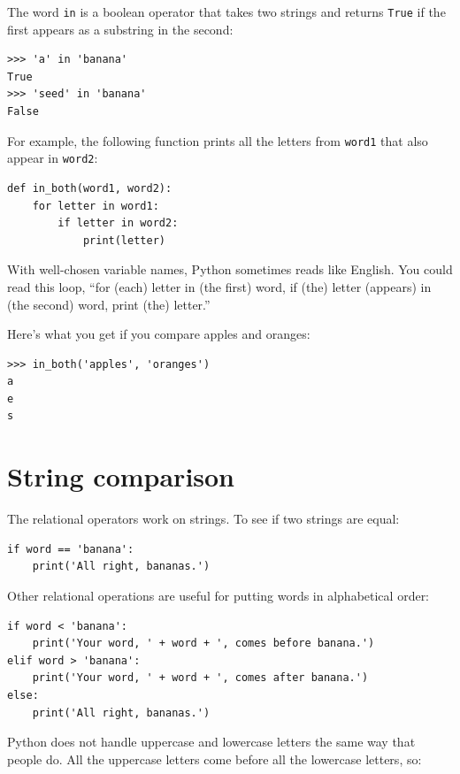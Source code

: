 \documentclass[10pt]{book}
\begin{document}

The word {\tt in} is a boolean operator that takes two strings and
returns {\tt True} if the first appears as a substring in the second:

\beforeverb
\begin{verbatim}
>>> 'a' in 'banana'
True
>>> 'seed' in 'banana'
False
\end{verbatim}
\afterverb
%
For example, the following function prints all the
letters from {\tt word1} that also appear in {\tt word2}:

\beforeverb
\begin{verbatim}
def in_both(word1, word2):
    for letter in word1:
        if letter in word2:
            print(letter)
\end{verbatim}
\afterverb
%
With well-chosen variable names,
Python sometimes reads like English.  You could read
this loop, ``for (each) letter in (the first) word, if (the) letter 
(appears) in (the second) word, print (the) letter.''

Here's what you get if you compare apples and oranges:

\beforeverb
\begin{verbatim}
>>> in_both('apples', 'oranges')
a
e
s
\end{verbatim}
\afterverb
%

\section{String comparison}


The relational operators work on strings.  To see if two strings are equal:

\beforeverb
\begin{verbatim}
if word == 'banana':
    print('All right, bananas.')
\end{verbatim}
\afterverb
%
Other relational operations are useful for putting words in alphabetical
order:

\beforeverb
\begin{verbatim}
if word < 'banana':
    print('Your word, ' + word + ', comes before banana.')
elif word > 'banana':
    print('Your word, ' + word + ', comes after banana.')
else:
    print('All right, bananas.')
\end{verbatim}
\afterverb
%
Python does not handle uppercase and lowercase letters the same way
that people do.  All the uppercase letters come before all the
lowercase letters, so:
\end{document}
